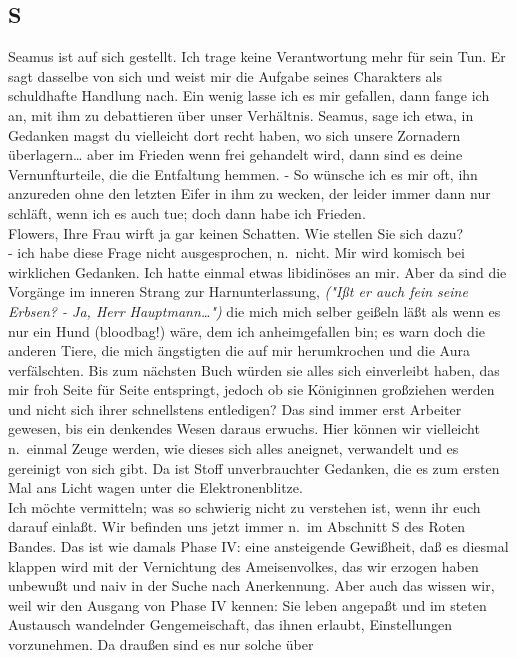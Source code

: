 \documentclass[
]{article}
\author{}
\date{\vspace{-2.5em}}
\begin{document}
\subsection{S}\label{s}

Seamus ist auf sich gestellt. Ich trage keine Verantwortung mehr für
sein Tun. Er sagt dasselbe von sich und weist mir die Aufgabe seines
Charakters als schuldhafte Handlung nach. Ein wenig lasse ich es mir
gefallen, dann fange ich an, mit ihm zu debattieren über unser
Verhältnis. Seamus, sage ich etwa, in Gedanken magst du vielleicht dort
recht haben, wo sich unsere Zornadern überlagern\ldots{} aber im Frieden
wenn frei gehandelt wird, dann sind es deine Vernunfturteile, die die
Entfaltung hemmen. - So wünsche ich es mir oft, ihn anzureden ohne den
letzten Eifer in ihm zu wecken, der leider immer dann nur schläft, wenn
ich es auch tue; doch dann habe ich Frieden.\\
Flowers, Ihre Frau wirft ja gar keinen Schatten. Wie stellen Sie sich
dazu?\\
- ich habe diese Frage nicht ausgesprochen, n.~nicht. Mir wird komisch
bei wirklichen Gedanken. Ich hatte einmal etwas libidinöses an mir. Aber
da sind die Vorgänge im inneren Strang zur Harnunterlassung, \emph{("Ißt
er auch fein seine Erbsen? - Ja, Herr Hauptmann\ldots")} die mich mich
selber geißeln läßt als wenn es nur ein Hund (bloodbag!) wäre, dem ich
anheimgefallen bin; es warn doch die anderen Tiere, die mich ängstigten
die auf mir herumkrochen und die Aura verfälschten. Bis zum nächsten
Buch würden sie alles sich einverleibt haben, das mir froh Seite für
Seite entspringt, jedoch ob sie Königinnen großziehen werden und nicht
sich ihrer schnellstens entledigen? Das sind immer erst Arbeiter
gewesen, bis ein denkendes Wesen daraus erwuchs. Hier können wir
vielleicht n.~einmal Zeuge werden, wie dieses sich alles aneignet,
verwandelt und es gereinigt von sich gibt. Da ist Stoff unverbrauchter
Gedanken, die es zum ersten Mal ans Licht wagen unter die
Elektronenblitze.\\
Ich möchte vermitteln; was so schwierig nicht zu verstehen ist, wenn ihr
euch darauf einlaßt. Wir befinden uns jetzt immer n.~im Abschnitt S des
Roten Bandes. Das ist wie damals Phase IV: eine ansteigende Gewißheit,
daß es diesmal klappen wird mit der Vernichtung des Ameisenvolkes, das
wir erzogen haben unbewußt und naiv in der Suche nach Anerkennung. Aber
auch das wissen wir, weil wir den Ausgang von Phase IV kennen: Sie leben
angepaßt und im steten Austausch wandelnder Gengemeischaft, das ihnen
erlaubt, Einstellungen vorzunehmen. Da draußen sind es nur solche über
\end{document}
